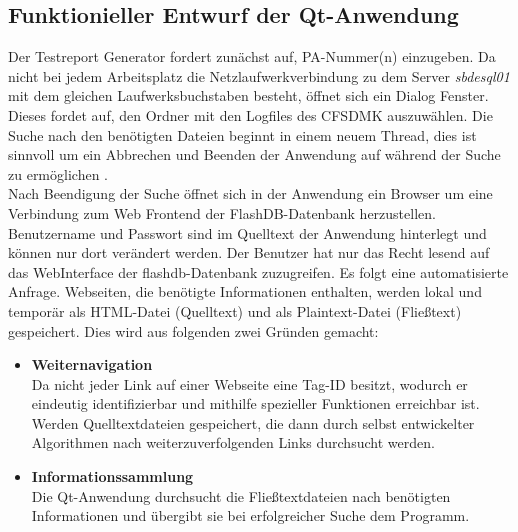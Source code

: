 \subsection{Funktionieller Entwurf der Qt-Anwendung}
Der Testreport Generator fordert zunächst auf, \ac{PA}-Nummer(n) einzugeben. Da nicht bei jedem Arbeitsplatz die Netzlaufwerkverbindung zu dem Server \textit{sbdesql01} mit dem gleichen Laufwerksbuchstaben besteht, öffnet sich ein Dialog Fenster. Dieses fordet auf, den Ordner mit den Logfiles des \ac{CFSDMK} auszuwählen. Die Suche nach den benötigten Dateien beginnt in einem neuem Thread, dies ist sinnvoll um ein Abbrechen und Beenden der Anwendung auf während der Suche zu ermöglichen
. \\
Nach Beendigung der Suche öffnet sich in der Anwendung ein Browser um eine Verbindung zum Web Frontend der FlashDB-Datenbank herzustellen. Benutzername und Passwort sind im Quelltext der Anwendung hinterlegt und können nur dort verändert werden. Der Benutzer hat nur das Recht lesend auf das WebInterface der flashdb-Datenbank zuzugreifen. Es folgt eine automatisierte Anfrage. Webseiten, die benötigte Informationen enthalten, werden lokal und temporär als HTML-Datei (Quelltext) und als Plaintext-Datei (Fließtext) gespeichert. Dies wird aus folgenden zwei Gründen gemacht:
\begin{itemize}
\item \textbf{Weiternavigation} \\
Da nicht jeder Link auf einer Webseite eine Tag-ID besitzt, wodurch er eindeutig identifizierbar und mithilfe spezieller Funktionen erreichbar ist. Werden Quelltextdateien gespeichert, die dann durch selbst entwickelter Algorithmen nach weiterzuverfolgenden Links durchsucht werden. 
\item \textbf{Informationssammlung} \\
Die Qt-Anwendung durchsucht die Fließtextdateien nach benötigten Informationen und übergibt sie bei erfolgreicher Suche dem Programm.
\end{itemize}
